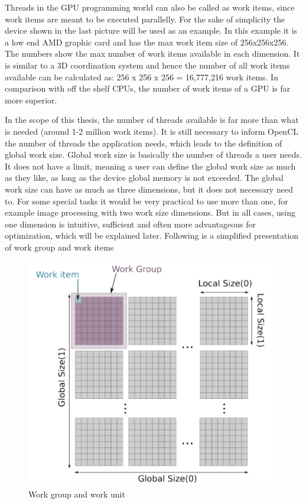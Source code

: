 Threads in the GPU programming world can also be called as work items, since work items are meant to be executed parallelly. For the sake of simplicity the device shown in the last picture will be used as an example. In this example it is a low end AMD graphic card and has the max work item size of 256x256x256. The numbers show the max number of work items available in each dimension. It is similar to a 3D coordination system and hence the number of all work items available can be calculated as: 256 x 256 x 256 = 16,777,216 work items. In comparison with off the shelf CPUs, the number of work items of a GPU is far more superior.

In the scope of this thesis, the number of threads available is far more than what is needed (around 1-2 million work items). It is still necessary to inform OpenCL the number of threads the application needs, which leads to the definition of global work size. Global work size is basically  the number of threads a user needs. It does not have a limit, meaning a user can define the global work size as much as they like, as long as the device global memory is not exceeded. The global work size can have as much as three dimensions, but it does not necessary need to. For some special tasks it would be very practical to use more than one, for example image processing with two work size dimensions. But in all cases, using one dimension is intuitive, sufficient and often more advantageous for optimization, which will be explained later. Following is a simplified presentation of work group and work items\cite{openclplatform}

\begin{figure}[H]
	\centering
	\includegraphics[width=10 cm]{images/itemunit.png}
	\caption{Work group and work unit}
	\label{ExampleOCTImage}
\end{figure}

